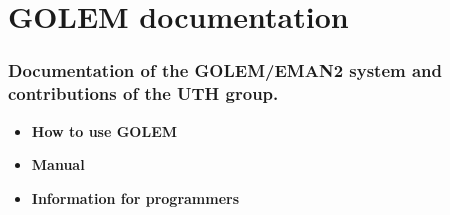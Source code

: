 %
\section{GOLEM documentation}
\subsubsection{Documentation of the GOLEM/EMAN2 system and contributions of the UTH group.}
 
\begin{itemize}
\item \textbf{How to use GOLEM}

\item \textbf{Manual}

\item \textbf{Information for programmers}


\end{itemize}


%
